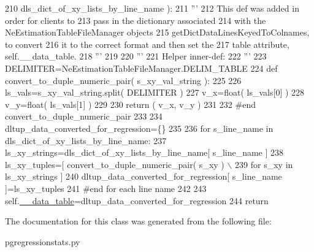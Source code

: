 \begin{DoxyCode}
210                         dls\_dict\_of\_xy\_lists\_by\_line\_name ):
211         \textcolor{stringliteral}{'''}
212 \textcolor{stringliteral}{        This def was added in order for clients to}
213 \textcolor{stringliteral}{        pass in the dictionary associated}
214 \textcolor{stringliteral}{        with the NeEstimationTableFileManager objects}
215 \textcolor{stringliteral}{        getDictDataLinesKeyedToColnames, to convert}
216 \textcolor{stringliteral}{        it to the correct format and then set the }
217 \textcolor{stringliteral}{        table attribute, self.\_\_data\_table.}
218 \textcolor{stringliteral}{        '''}
219 
220         \textcolor{stringliteral}{'''}
221 \textcolor{stringliteral}{        Helper inner-def:}
222 \textcolor{stringliteral}{        '''}
223         DELIMITER=NeEstimationTableFileManager.DELIM\_TABLE
224         \textcolor{keyword}{def }convert\_to\_duple\_numeric\_pair( s\_xy\_val\_string ):
225 
226             ls\_vals=s\_xy\_val\_string.split( DELIMITER )
227             v\_x=float( ls\_vals[0] )
228             v\_y=float( ls\_vals[1] )
229 
230             \textcolor{keywordflow}{return} ( v\_x, v\_y ) 
231 
232         \textcolor{comment}{#end convert\_to\_duple\_numeric\_pair}
233 
234         dltup\_data\_converted\_for\_regression=\{\}  
235 
236         \textcolor{keywordflow}{for} s\_line\_name \textcolor{keywordflow}{in} dls\_dict\_of\_xy\_lists\_by\_line\_name:
237             ls\_xy\_strings=dls\_dict\_of\_xy\_lists\_by\_line\_name[ s\_line\_name ]
238             ls\_xy\_tuples=[ convert\_to\_duple\_numeric\_pair( s\_xy ) \(\backslash\)
239                                             \textcolor{keywordflow}{for} s\_xy \textcolor{keywordflow}{in} ls\_xy\_strings ]
240             dltup\_data\_converted\_for\_regression[ s\_line\_name ]=ls\_xy\_tuples
241         \textcolor{comment}{#end for each line name}
242         
243         self.\hyperlink{classnegui_1_1pgregressionstats_1_1PGRegressionStats_aab8387332274522c48e48e1947f0fa1a}{\_\_data\_table}=dltup\_data\_converted\_for\_regression
244         \textcolor{keywordflow}{return}
\end{DoxyCode}


The documentation for this class was generated from the following file\+:\begin{DoxyCompactItemize}
\item 
pgregressionstats.\+py\end{DoxyCompactItemize}
